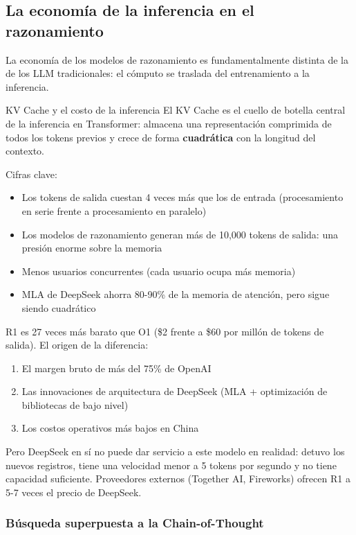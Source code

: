\subsection{La economía de la inferencia en el razonamiento}

La economía de los modelos de razonamiento es fundamentalmente distinta de la de los LLM tradicionales: el cómputo se traslada del entrenamiento a la inferencia.

\begin{knowledgebox}{KV Cache y el costo de la inferencia}
El KV Cache es el cuello de botella central de la inferencia en Transformer: almacena una representación comprimida de todos los tokens previos y crece de forma \textbf{cuadrática} con la longitud del contexto.

Cifras clave:
\begin{itemize}
    \item Los tokens de salida cuestan 4 veces más que los de entrada (procesamiento en serie frente a procesamiento en paralelo)
    \item Los modelos de razonamiento generan más de 10,000 tokens de salida: una presión enorme sobre la memoria
    \item Menos usuarios concurrentes (cada usuario ocupa más memoria)
    \item MLA de DeepSeek ahorra 80-90\% de la memoria de atención, pero sigue siendo cuadrático
\end{itemize}

R1 es 27 veces más barato que O1 (\$2 frente a \$60 por millón de tokens de salida). El origen de la diferencia:
\begin{enumerate}
    \item El margen bruto de más del 75\% de OpenAI
    \item Las innovaciones de arquitectura de DeepSeek (MLA + optimización de bibliotecas de bajo nivel)
    \item Los costos operativos más bajos en China
\end{enumerate}

Pero DeepSeek en sí no puede dar servicio a este modelo en realidad: detuvo los nuevos registros, tiene una velocidad menor a 5 tokens por segundo y no tiene capacidad suficiente. Proveedores externos (Together AI, Fireworks) ofrecen R1 a 5-7 veces el precio de DeepSeek.
\end{knowledgebox}

\subsubsection{Búsqueda superpuesta a la Chain-of-Thought}

